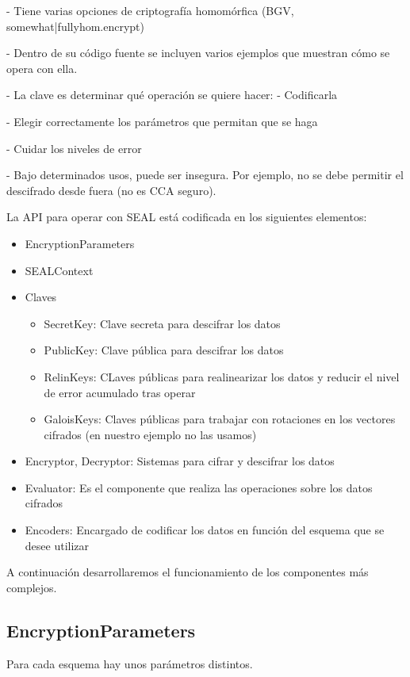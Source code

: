 - Tiene varias opciones de criptografía homomórfica (BGV, {somewhat|fully}hom.encrypt)

- Dentro de su código fuente se incluyen varios ejemplos que muestran cómo se opera con ella.

- La clave es determinar qué operación se quiere hacer:
    - Codificarla

    - Elegir correctamente los parámetros que permitan que se haga

    - Cuidar los niveles de error

- Bajo determinados usos, puede ser insegura. Por ejemplo, no se debe permitir el descifrado desde fuera \cite{peng_danger_2019} (no es CCA seguro).

La API para operar con SEAL está codificada en los siguientes elementos:

\begin{itemize}
  \item EncryptionParameters
  \item SEALContext
  \item Claves
  \begin{itemize}
    \item SecretKey: Clave secreta para descifrar los datos
    \item PublicKey: Clave pública para descifrar los datos
    \item RelinKeys: CLaves públicas para realinearizar los datos y reducir el nivel de error acumulado tras operar
    \item GaloisKeys: Claves públicas para trabajar con rotaciones en los vectores cifrados (en nuestro ejemplo no las usamos)
  \end{itemize}
  \item Encryptor, Decryptor: Sistemas para cifrar y descifrar los datos
  \item Evaluator: Es el componente que realiza las operaciones sobre los datos cifrados
  \item Encoders: Encargado de codificar los datos en función del esquema que se desee utilizar
\end{itemize}

A continuación desarrollaremos el funcionamiento de los componentes más complejos.

\subsection{EncryptionParameters}

Para cada esquema hay unos parámetros distintos.

